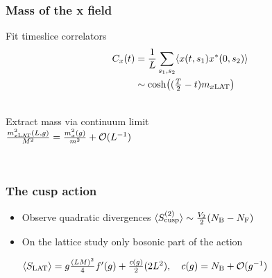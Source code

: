 \documentclass{beamer}
\begin{document}
{\usefoottemplate{}
\begin{frame}
\frametitle{Mass of the x field}
\begin{minipage}{0.5\linewidth}
\vspace{-20mm}
Fit timeslice correlators 
\begin{align*}
\huge C_{x}(t) &= \frac{1}{L}\sum\limits_{s_{1},s_{2}} \langle x(t,s_{1})x^{*}(0,s_{2})\rangle \\
&\sim {\rm cosh}\big( (\tfrac{T}{2}-t) m_{x{\rm LAT}} \big)
\end{align*}


\hfill\\
\vspace{10mm}
Extract mass via continuum limit\\
$\frac{m_{x \rm LAT}^{2}(L,g)}{M^{2}} = \frac{m_{x}^{2}(g)}{m^{2}} + \mathcal{O}(L^{-1})$
\end{minipage}
\begin{minipage}{0.45\linewidth}
\vspace{-10mm}
\\
\vspace{-6mm}

\end{minipage}
\end{frame}


\begin{frame}
\frametitle{The cusp action}
\begin{itemize}
\item Observe quadratic divergences $\langle S_{\rm cusp}^{(2)}\rangle \sim \frac{V_{2}}{2}(N_{\rm B}-N_{\rm F})$
\item On the lattice study only bosonic part of the action\\
\begin{center}
$\langle S_{\rm LAT} \rangle = g \frac{(LM)^{2}}{4}f'(g) + \frac{c(g)}{2}(2L^{2}), \quad c(g) = N_{\rm B} +\mathcal{O}(g^{-1})$
\end{center}
\end{itemize}
\vspace{4mm}
%
\end{frame}

}
\end{document}
